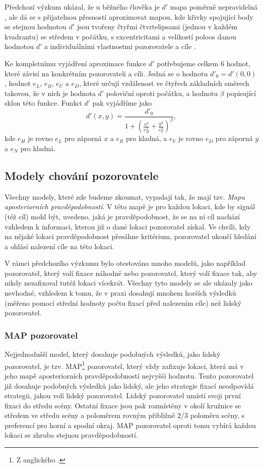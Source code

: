 Předchozí výzkum ukázal, že u běžného člověka je $d'$ mapa poměrně
nepravidelná \citep{Najemnik08}, ale dá se s přijatelnou přesností aproximovat mapou, kde křivky
spojující body se stejnou hodnotou $d'$ jsou tvořeny čtyřmi čtvrtelipsami
(jednou v každém kvadrantu) se středem v počátku, s
excentricitami a velikostí poloos danou hodnotou $d'$ a individuálními
vlastnostmi pozorovatele a cíle \citep{Ellipse}. 

Ke kompletnímu vyjádření aproximace funkce $d'$ potřebujeme celkem 6 hodnot,
které závisí na konkrétním pozorovateli a cíli. Jedná se o hodnotu $d'_0 =
d'(0,0)$, hodnot $e_L$, $e_R$, $e_U$ a $e_D$, které určují vzdálenost ve čtyřech
základních směrech takovou, že v nich je hodnota $d'$ poloviční oproti počátku,
a hodnotu $\beta$ popisující sklon této funkce. Funkci $d'$ pak vyjádříme jako
$$ d'(x,y) = \frac{d'_0}{1+\left(\frac{x^2}{e_H^2}+\frac{y^2}{e_V^2}
\right)^\beta}, $$ kde $e_H$ je rovno $e_L$ pro záporná $x$ a $e_R$ pro kladná,
a $e_V$ je rovno $e_D$ pro záporná $y$ a $e_N$ pro kladná.


\subsection{Modely chování pozorovatele}

Všechny modely, které zde budeme zkoumat, vypadají tak, že mají tzv. {\it Mapu
aposteriorních pravděpodobností}. V této mapě je pro každou lokaci, kde by
signál (též cíl) mohl být, uvedeno, jaká je pravděpodobnost, že se na ní cíl
nachází vzhledem k informaci, kterou již o dané lokaci pozorovatel získal. Ve
chvíli, kdy na nějaké lokaci pravděpodobnost přesáhne kritérium, pozorovatel
ukončí hledání a ohlásí nalezení cíle na této lokaci.

V rámci předchozího výzkumu bylo otestováno mnoho modelů, jako například
pozorovatel, který volí fixace náhodně nebo pozorovatel, který volí fixace 
tak, aby nikdy nezafixoval tutéž lokaci vícekrát. Všechny tyto modely se ale ukázaly jako
nevhodné, vzhledem k tomu, že v praxi dosahují mnohem horších výsledků (měřeno
pomocí střední hodnoty počtu fixací před nalezením cíle) než lidský
pozorovatel.

\subsubsection{MAP pozorovatel}

Nejjednodušší model, který dosahuje podobných výsledků, jako lidský pozorovatel,
je tzv. MAP\footnote{Z anglického .}
pozorovatel, který vždy zafixuje lokaci, která má v jeho mapě aposteriorních
pravděpodobností nejvyšší hodnotu. Tento pozorovatel již dosahuje podobných
výsledků jako lidský, ale jeho strategie fixací neodpovídá strategii, jakou
volí lidský pozorovatel. Lidský pozorovatel umístí svoji první fixaci do středu
scény. Ostatní fixace jsou pak rozmístěny v okolí kružnice se středem ve středu
scény a poloměrem rovným přibližně $2/3$ poloměru scény, s preferencí pro horní
a spodní okraj. MAP pozorovatel oproti tomu vybírá každou lokaci se zhruba
stejnou pravděpodobností.

